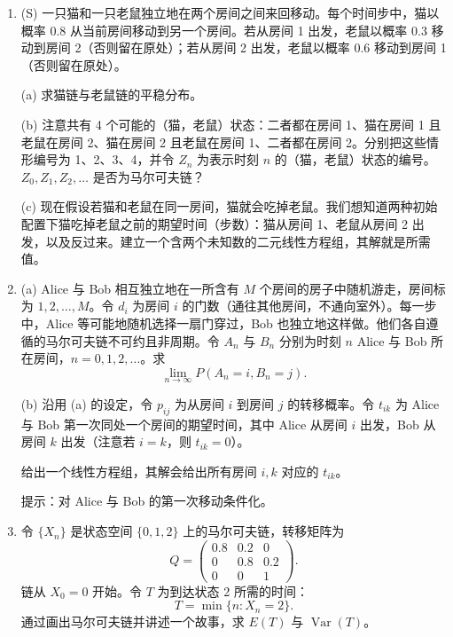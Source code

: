 \documentclass[UTF8,12pt,a4paper,fontset=fandol]{ctexart}
\begin{document}
\begin{enumerate}
提示：令 $w_{ij}=s_iq_{ij}$，其中 $\mathbf s$ 是平稳分布，$q_{ij}$ 是 $Q$ 的 $(i,j)$ 元。

\subsection*{综合练习}

\item[$21.$] \textnormal{(S)} 一只猫和一只老鼠独立地在两个房间之间来回移动。每个时间步中，猫以概率 0.8 从当前房间移动到另一个房间。若从房间 1 出发，老鼠以概率 0.3 移动到房间 2（否则留在原处）；若从房间 2 出发，老鼠以概率 0.6 移动到房间 1（否则留在原处）。

(a) 求猫链与老鼠链的平稳分布。

(b) 注意共有 4 个可能的（猫，老鼠）状态：二者都在房间 1、猫在房间 1 且老鼠在房间 2、猫在房间 2 且老鼠在房间 1、二者都在房间 2。分别把这些情形编号为 1、2、3、4，并令 $Z_n$ 为表示时刻 $n$ 的（猫，老鼠）状态的编号。$Z_0,Z_1,Z_2,\ldots$ 是否为马尔可夫链？

(c) 现在假设若猫和老鼠在同一房间，猫就会吃掉老鼠。我们想知道两种初始配置下猫吃掉老鼠之前的期望时间（步数）：猫从房间 1、老鼠从房间 2 出发，以及反过来。建立一个含两个未知数的二元线性方程组，其解就是所需值。

\item[$22.$] (a) Alice 与 Bob 相互独立地在一所含有 $M$ 个房间的房子中随机游走，房间标为 $1,2,\ldots,M$。令 $d_i$ 为房间 $i$ 的门数（通往其他房间，不通向室外）。每一步中，Alice 等可能地随机选择一扇门穿过，Bob 也独立地这样做。他们各自遵循的马尔可夫链不可约且非周期。令 $A_n$ 与 $B_n$ 分别为时刻 $n$ Alice 与 Bob 所在房间，$n=0,1,2,\ldots$。求
\[
  \lim_{n\to\infty}P(A_n=i,B_n=j).
\]

(b) 沿用 (a) 的设定，令 $p_{ij}$ 为从房间 $i$ 到房间 $j$ 的转移概率。令 $t_{ik}$ 为 Alice 与 Bob 第一次同处一个房间的期望时间，其中 Alice 从房间 $i$ 出发，Bob 从房间 $k$ 出发（注意若 $i=k$，则 $t_{ik}=0$）。

给出一个线性方程组，其解会给出所有房间 $i,k$ 对应的 $t_{ik}$。

提示：对 Alice 与 Bob 的第一次移动条件化。

\item[$23.$] 令 $\{X_n\}$ 是状态空间 $\{0,1,2\}$ 上的马尔可夫链，转移矩阵为
\[
  Q=
  \begin{pmatrix}
    0.8 & 0.2 & 0\\
    0 & 0.8 & 0.2\\
    0 & 0 & 1
  \end{pmatrix}.
\]
链从 $X_0=0$ 开始。令 $T$ 为到达状态 2 所需的时间：
\[
  T=\min\{n:X_n=2\}.
\]
通过画出马尔可夫链并讲述一个故事，求 $E(T)$ 与 $\operatorname{Var}(T)$。


\end{enumerate}
\end{document}
